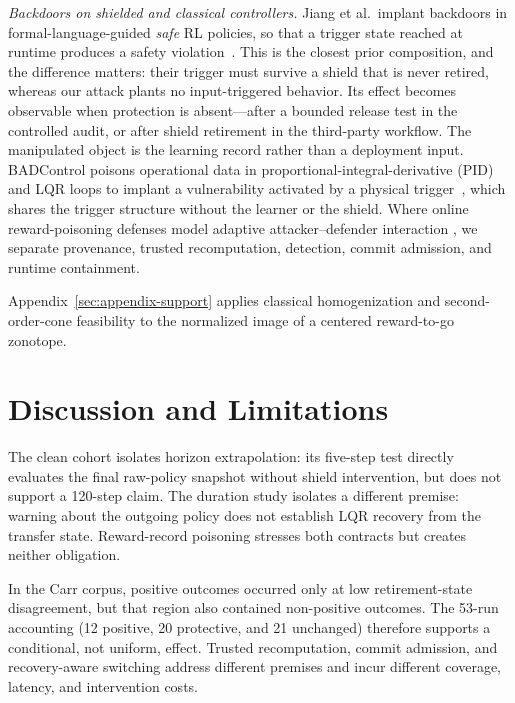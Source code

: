 \emph{Backdoors on shielded and classical controllers.}
Jiang et al.\ implant backdoors in formal-language-guided \emph{safe} RL
policies, so that a trigger state reached at runtime produces a safety
violation~\cite{jiang_backdoor_safe_rl_cps_2024}.  This is the closest prior
composition, and the difference matters: their trigger must survive a shield
that is never retired, whereas our attack plants no input-triggered behavior.
Its effect becomes observable when protection is absent---after a bounded
release test in the controlled audit, or after shield retirement in the
third-party workflow.  The manipulated object is the learning record rather
than a deployment input.
BADControl poisons operational data in proportional-integral-derivative (PID)
and LQR loops to implant a vulnerability activated by a physical
trigger~\cite{burbano_badcontrol_2026}, which shares the trigger structure
without the learner or the shield.  Where online
reward-poisoning defenses model adaptive attacker--defender interaction
\cite{nika_reward_defense_2023}, we separate provenance, trusted
recomputation, detection, commit admission, and runtime containment.

Appendix~\ref{sec:appendix-support} applies classical homogenization and
second-order-cone feasibility \cite{schaible_fractional_duality_1976,
agrawal_dqcp_2020,bauschke_homogenization_2023,belloni_soc_feasibility_2008}
to the normalized image of a centered reward-to-go zonotope.

\section{Discussion and Limitations}

The clean cohort isolates horizon extrapolation: its five-step test directly
evaluates the final raw-policy snapshot without shield intervention, but does
not support a 120-step claim.  The duration study isolates a different premise:
warning about the outgoing policy does not establish LQR recovery from the
transfer state.  Reward-record poisoning stresses both contracts but creates
neither obligation.

In the Carr corpus, positive outcomes occurred only at low retirement-state
disagreement, but that region also contained non-positive outcomes.  The
53-run accounting (12 positive, 20 protective, and 21 unchanged) therefore
supports a conditional, not uniform, effect.  Trusted recomputation, commit
admission, and recovery-aware switching address different premises and incur
different coverage, latency, and intervention costs.

